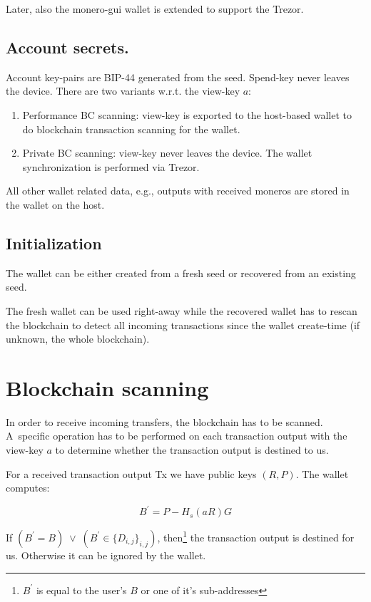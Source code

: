 \documentclass[]{article}
\begin{document}
Later, also the monero-gui wallet is extended to support the Trezor.

\subsection{Account secrets.}
Account key-pairs are BIP-44 generated from the seed. Spend-key never leaves the device. There are two variants w.r.t. the view-key $a$:

\begin{enumerate}
	\item Performance BC scanning: view-key is exported to the host-based wallet to do blockchain transaction scanning for the wallet.
	\item Private BC scanning: view-key never leaves the device. The wallet synchronization is performed via Trezor. 
\end{enumerate}

All other wallet related data, e.g., outputs with received moneros are
stored in the wallet on the host.

\subsection{Initialization} 
The wallet can be either created from a fresh seed or recovered from an existing seed.

The fresh wallet can be used right-away while the recovered wallet has to rescan the blockchain to detect all incoming transactions since the wallet create-time (if unknown, the whole blockchain).

\section{Blockchain scanning}

In order to receive incoming transfers, the blockchain has to be scanned. A~specific operation has to be performed on each transaction output with the view-key $a$ to determine whether the transaction output is destined to us.

For a received transaction output Tx we have public keys $\left(R, P\right)$.
The wallet computes: 

\begin{equation}
B^\prime = P - H_s(aR)G
\end{equation}


If $\left(B^\prime = B\right) \; \vee \; \left(B^\prime \in \{D_{i,j}\}_{i,j}\right)$, then\footnote{$B^\prime$ is equal to the user's $B$ or one of it's sub-addresses} the transaction output is destined for us. Otherwise it can be ignored by the wallet.
\end{document}
